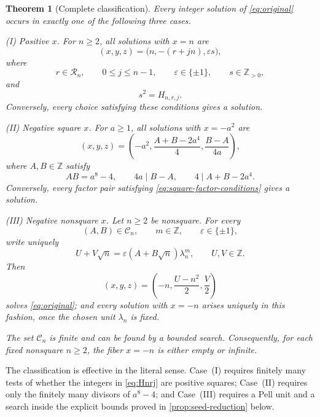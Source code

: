 \documentclass[a4paper,11pt]{amsart}
\newtheorem{theorem}{Theorem}[section]
\theoremstyle{definition}
\theoremstyle{remark}
\newcommand{\Z}{\mathbb Z}
\newcommand{\eps}{\varepsilon}
\begin{document}
\begin{theorem}[Complete classification]\label{thm:main}
Every integer solution of \eqref{eq:original} occurs in exactly one of the following three cases.

\smallskip
\noindent
\textup{(I) Positive $x$.}
For $n\ge2$, all solutions with $x=n$ are
\begin{equation}\label{eq:positive-classification}
(x,y,z)=\bigl(n,-(r+jn),\eps s\bigr),
\end{equation}
where
\[
r\in\mathcal R_n,
\qquad 0\le j\le n-1,
\qquad \eps\in\{\pm1\},
\qquad s\in\Z_{>0},
\]
and
\begin{equation}\label{eq:positive-square-condition}
s^2=H_{n,r,j}.
\end{equation}
Conversely, every choice satisfying these conditions gives a solution.

\smallskip
\noindent
\textup{(II) Negative square $x$.}
For $a\ge1$, all solutions with $x=-a^2$ are
\begin{equation}\label{eq:square-classification}
(x,y,z)
 =\left(-a^2,
 \frac{A+B-2a^4}{4},
 \frac{B-A}{4a}\right),
\end{equation}
where $A,B\in\Z$ satisfy
\begin{equation}\label{eq:square-factor-conditions}
AB=a^8-4,
\qquad 4a\mid B-A,
\qquad 4\mid A+B-2a^4.
\end{equation}
Conversely, every factor pair satisfying \eqref{eq:square-factor-conditions} gives a solution.

\smallskip
\noindent
\textup{(III) Negative nonsquare $x$.}
Let $n\ge2$ be nonsquare.  For every
\[
(A,B)\in\mathcal C_n,
\qquad m\in\Z,
\qquad \eps\in\{\pm1\},
\]
write uniquely
\begin{equation}\label{eq:pell-orbit}
U+V\sqrt n
 =\eps(A+B\sqrt n)\lambda_n^m,
\qquad U,V\in\Z.
\end{equation}
Then
\begin{equation}\label{eq:nonsquare-classification}
(x,y,z)
 =\left(-n,\frac{U-n^2}{2},\frac V2\right)
\end{equation}
solves \eqref{eq:original}; and every solution with $x=-n$ arises uniquely in this fashion, once the chosen unit $\lambda_n$ is fixed.

The set $\mathcal C_n$ is finite and can be found by a bounded search.  Consequently, for each fixed nonsquare $n\ge2$, the fiber $x=-n$ is either empty or infinite.
\end{theorem}

The classification is effective in the literal sense.  Case~\textup{(I)} requires finitely many tests of whether the integers in \eqref{eq:Hnrj} are positive squares; Case~\textup{(II)} requires only the finitely many divisors of $a^8-4$; and Case~\textup{(III)} requires a Pell unit and a search inside the explicit bounds proved in \cref{prop:seed-reduction} below.
\end{document}
